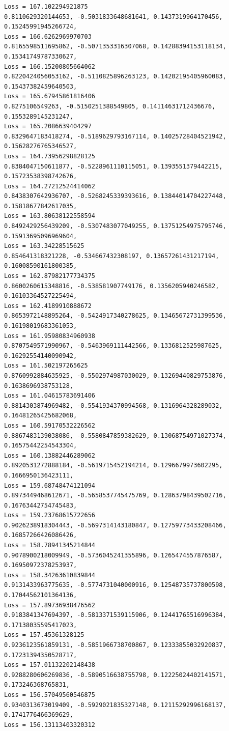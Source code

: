 \documentclass[11pt]{article}
\begin{document}
\begin{Verbatim}[commandchars=\\\{\}]
Loss = 167.102294921875
0.8110629320144653, -0.5031833648681641, 0.1437319964170456,
0.15245991945266724,
Loss = 166.6262969970703
0.8165598511695862, -0.5071353316307068, 0.14288394153118134,
0.15341749787330627,
Loss = 166.15200805664062
0.8220424056053162, -0.5110825896263123, 0.14202195405960083,
0.15437382459640503,
Loss = 165.67945861816406
0.8275106549263, -0.5150251388549805, 0.14114631712436676, 0.1553289145231247,
Loss = 165.2086639404297
0.8329647183418274, -0.5189629793167114, 0.14025728404521942,
0.15628276765346527,
Loss = 164.73956298828125
0.8384047150611877, -0.5228961110115051, 0.1393551379442215,
0.15723538398742676,
Loss = 164.27212524414062
0.8438307642936707, -0.5268245339393616, 0.13844014704227448,
0.15818677842617035,
Loss = 163.80638122558594
0.8492429256439209, -0.5307483077049255, 0.13751254975795746,
0.15913695096969604,
Loss = 163.34228515625
0.854641318321228, -0.534667432308197, 0.13657261431217194, 0.16008590161800385,
Loss = 162.87982177734375
0.8600260615348816, -0.538581907749176, 0.1356205940246582, 0.16103364527225494,
Loss = 162.4189910888672
0.8653972148895264, -0.5424917340278625, 0.13465672731399536,
0.16198019683361053,
Loss = 161.95980834960938
0.8707549571990967, -0.5463969111442566, 0.1336812525987625,
0.16292554140090942,
Loss = 161.502197265625
0.8760992884635925, -0.5502974987030029, 0.13269440829753876,
0.1638696938753128,
Loss = 161.04615783691406
0.8814303874969482, -0.5541934370994568, 0.1316964328289032,
0.16481265425682068,
Loss = 160.59170532226562
0.8867483139038086, -0.5580847859382629, 0.13068754971027374,
0.16575442254543304,
Loss = 160.13882446289062
0.8920531272888184, -0.5619715452194214, 0.1296679973602295, 0.1666950136423111,
Loss = 159.68748474121094
0.8973449468612671, -0.5658537745475769, 0.12863798439502716,
0.16763442754745483,
Loss = 159.23768615722656
0.9026238918304443, -0.5697314143180847, 0.12759773433208466,
0.16857266426086426,
Loss = 158.78941345214844
0.9078900218009949, -0.5736045241355896, 0.1265474557876587,
0.16950972378253937,
Loss = 158.34263610839844
0.9131433963775635, -0.5774731040000916, 0.12548735737800598,
0.17044562101364136,
Loss = 157.89736938476562
0.9183841347694397, -0.5813371539115906, 0.12441765516996384,
0.17138035595417023,
Loss = 157.45361328125
0.9236123561859131, -0.5851966738700867, 0.12333855032920837,
0.17231394350528717,
Loss = 157.01132202148438
0.9288280606269836, -0.5890516638755798, 0.12225024402141571, 0.173246368765831,
Loss = 156.57049560546875
0.9340313673019409, -0.5929021835327148, 0.12115292996168137,
0.1741776466369629,
Loss = 156.13113403320312

\end{Verbatim}
\end{document}
